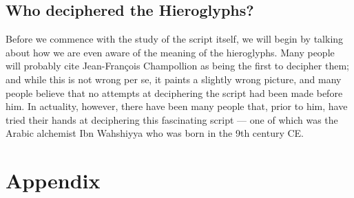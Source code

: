 \documentclass[a5paper,twoside,11pt]{report}
\begin{document}



\thispagestyle{empty}
  \mbox{}
  \newpage







\tableofcontents
\newpage





\thispagestyle{empty}
  \mbox{}
  \newpage

\chapter*{Who deciphered the Hieroglyphs?}
  Before we commence with the study of the script itself, we will begin by talking about how we are even aware of the meaning of the hieroglyphs. Many people will probably cite Jean-François Champollion as being the first to decipher them; and while this is not wrong per se, it paints a slightly wrong picture, and many people believe that no attempts at deciphering the script had been made before him. In actuality, however, there have been many people that, prior to him, have tried their hands at deciphering this fascinating script — one of which was the Arabic alchemist Ibn Wahshiyya who was born in the 9th century CE.


	\part*{Appendix}

		\newpage
		\printbibliography
\end{document}
